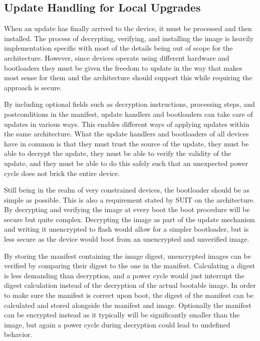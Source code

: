 \documentclass[0-thesis.tex]{subfiles}
\begin{document}
\subsection{Update Handling for Local Upgrades}
\label{ssec:upgrading}
When an update has finally arrived to the device, it must be processed and then installed.
The process of decrypting, verifying, and installing the image is heavily implementation
specific with most of the details being out of scope for the architecture. However, since
devices operate using different hardware and bootloaders they must be given the freedom to
update in the way that makes most sense for them and the architecture should support this
while requiring the approach is secure.

By including optional fields such as decryption instructions, processing steps, and
postconditions in the manifest, update handlers and bootloaders can take care of updates
in various ways. This enables different ways of applying updates within the same
architecture. What the update handlers and bootloaders of all devices have in common is
that they must trust the source of the update, they must be able to decrypt the update,
they must be able to verify the validity of the update, and they must be able to do this
safely such that an unexpected power cycle does not brick the entire device.

Still being in the realm of very constrained devices, the bootloader should be as simple
as possible. This is also a requirement stated by SUIT on the architecture. By decrypting
and verifying the image at every boot the boot procedure will be secure but quite complex.
Decrypting the image as part of the update mechanism and writing it unencrypted to flash
would allow for a simpler bootloader, but is less secure as the device would boot from an
unencrypted and unverified image.

By storing the manifest containing the image digest, unencrypted images can be verified by
comparing their digest to the one in the manifest. Calculating a digest is less demanding
than decryption, and a power cycle would just interrupt the digest calculation instead of
the decryption of the actual bootable image. In order to make sure the manifest is correct
upon boot, the digest of the manifest can be calculated and stored alongside the manifest
and image. Optionally the manifest can be encrypted instead as it typically will be
significantly smaller than the image, but again a power cycle during decryption could lead
to undefined behavior.
\end{document}
